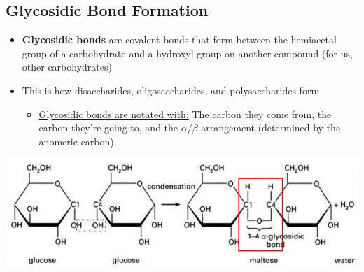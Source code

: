 \documentclass[10pt]{article}
\begin{document}
\subsection*{Glycosidic Bond Formation}
\begin{itemize}
    \item \textbf{Glycosidic bonds} are covalent bonds that form between the hemiacetal group of a carbohydrate and a hydroxyl group on another compound (for us, other carbohydrates)
    \item This is how disaccharides, oligosaccharides, and polysaccharides form
    \begin{itemize}
        \item \underline{Glycosidic bonds are notated with:} The carbon they come from, the carbon they're going to, and the $\alpha/\beta$ arrangement (determined by the anomeric carbon)
    \end{itemize}
\end{itemize}
\begin{center}
    \includegraphics*[width=\textwidth]{L1_13.png}
\end{center}
\end{document}
